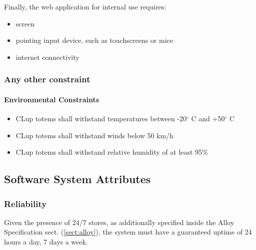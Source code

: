 \bigskip \noindent Finally, the web application for internal use requires: \newline
\begin{itemize}
    \item screen
    \item pointing input device, such as touchscreens or mice
    \item internet connectivity
\end{itemize}


\subsubsection{Any other constraint}
\paragraph{Environmental Constraints}
\label{par:envConstraints}
\begin{itemize}[leftmargin=+.8in]
    \item[\ref{par:envConstraints}.1.1] CLup totems shall withstand temperatures between -20$^{\circ}$ C and +50$^{\circ}$ C
    \item[\ref{par:envConstraints}.1.2] CLup totems shall withstand winds below 50 km/h
    \item[\ref{par:envConstraints}.1.3] CLup totems shall withstand relative humidity of at least 95\% 
\end{itemize}

\subsection{Software System Attributes}

\subsubsection{Reliability}
Given the presence of 24/7 stores, as additionally specified inside the Alloy Specification sect. (\ref{sect:alloy}), the system must have a guaranteed uptime of 24 hours a day, 7 days a week.
